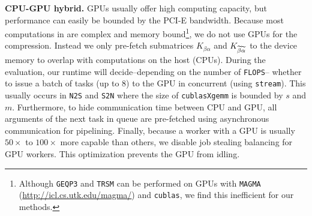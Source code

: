 \textbf{CPU-GPU hybrid.}
GPUs usually offer high computing capacity, but  performance 
can easily be bounded by the PCI-E bandwidth. 
Because most computations in 
 are complex and memory bound\footnote{\scriptsize Although \texttt{GEQP3} 
and \texttt{TRSM} can be performed on GPUs with \texttt{MAGMA}
(\url{http://icl.cs.utk.edu/magma/})
and \texttt{cublas}, we find this inefficient for our methods.},
we do not use GPUs for the compression.
Instead we only pre-fetch submatrices $K_{\beta\alpha}$ and
$K_{{\widetilde{\beta}}{\widetilde{\alpha}}}$ to the device memory to overlap with
computations on the host (CPUs).
During the evaluation, our runtime will decide--depending on the number of
\texttt{FLOPS}-- whether to issue a batch
of tasks (up to 8) to the GPU in concurrent (using \texttt{stream}). This usually 
occurs in \texttt{N2S} and \texttt{S2N} where the size of 
\texttt{cublasXgemm}
is bounded by $s$ and $m$.
Furthermore, to hide communication time between CPU and GPU, 
all arguments of the next task in queue are pre-fetched using
asynchronous communication for pipelining. 
Finally, because a worker with a GPU is usually 
$50\times$ to $100\times$ more capable than others, we disable job stealing balancing for GPU workers.
This optimization prevents the GPU from idling.

